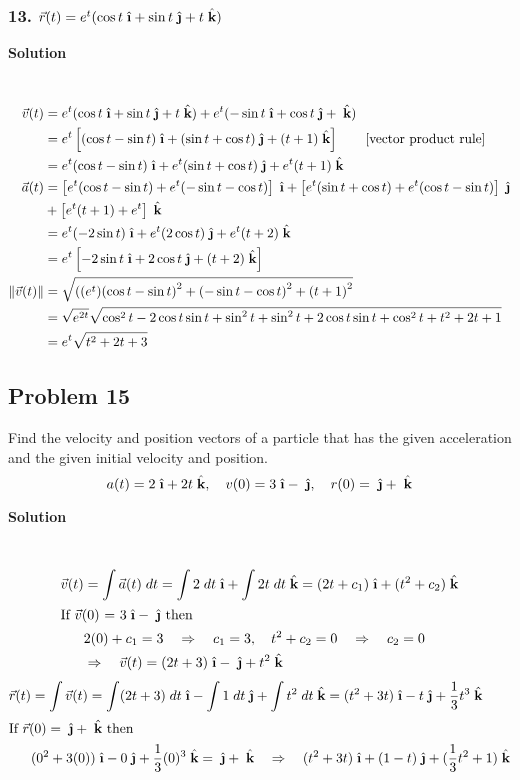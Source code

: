 \documentclass{article}
\newcommand{\ihat}{\;\hat{\textbf{\i}}}
\newcommand{\jhat}{\;\hat{\textbf{\j}}}
\newcommand{\khat}{\;\hat{\textbf{k}}}
\newcommand{\rvec}{\vec{r}(t)}
\newcommand\vc[2]{\vec{#1}(#2)}
\newcommand\mgv[1]{\|#1\|}
\newcommand\mgvvv[3]{\sqrt{\left(#1\right)^2 + \left(#2\right)^2 + \left(#3\right)^2}}
\newcommand\rr{\quad\Rightarrow\quad}
\begin{document}
\subsubsection*{13. $\rvec = e^t(\cos t\ihat + \sin t\jhat + t\khat)$}
\centerline{\textbf{Solution}} \\
\begin{align*}
    \vc v t &= e^t(\cos t\ihat + \sin t\jhat + t\khat) + e^t(-\sin t\ihat + \cos t\jhat + \khat)  \\
            &= e^t\left[(\cos t - \sin t)\ihat + (\sin t + \cos t)\jhat + (t + 1)\khat\right] \qquad [\text{vector product rule}] \\
            &= e^t(\cos t - \sin t)\ihat + e^t(\sin t + \cos t)\jhat + e^t(t + 1)\khat \\
    \vc a t &= \left[e^t(\cos t - \sin t) + e^t(-\sin t - \cos t)\right]\ihat + \left[e^t(\sin t + \cos t) + e^t(\cos t - \sin t)\right]\jhat \\
            &+ \left[e^t(t + 1) + e^t\right]\khat \\
            &= e^t(-2\sin t)\ihat + e^t(2\cos t)\jhat + e^t(t + 2)\khat \\
            &= e^t\left[-2\sin t\ihat + 2\cos t\jhat + (t + 2)\khat \right] \\
    \mgv{\vc v t} &= \mgvvv{(e^t) (\cos t - \sin t}{-\sin t - \cos t}{t + 1} \\
                  &= \sqrt{e^{2t}}\sqrt{\cos^2 t - 2\cos t \sin t + \sin^2 t + \sin^2 t + 2\cos t \sin t + \cos^2 t + t^2 + 2t + 1} \\ 
                  &= e^t\sqrt{t^2 + 2t + 3} \\
\end{align*}
\subsection*{Problem 15}

Find the velocity and position vectors of a particle that has the given acceleration and the given initial velocity and position.
\[
    a(t) = 2\ihat + 2t\khat, \quad v(0) = 3\ihat - \jhat, \quad r(0) = \jhat + \khat
\]
\centerline{\textbf{Solution}} \\
\begin{align*}
    \vc v t &= \int \vc a t \; dt  =  \int 2\;dt\ihat + \int 2t\;dt\khat  = (2t + c_1)\ihat + (t^2 + c_2)\khat \\
    \intertext{If $\vc v 0$ = $3\ihat - \jhat$ then}
            &2(0) + c_1 = 3 \rr c_1 = 3, \quad t^2 + c_2 = 0 \rr c_2 = 0 \\
            &\Rightarrow\quad \vc v t = (2t + 3)\ihat - \jhat + t^2\khat
\end{align*}
\begin{align*}
    \vc r t &= \int \vc v t = \int (2t + 3)\;dt\ihat - \int 1\;dt\jhat + \int t^2\;dt\khat = (t^2 + 3t)\ihat - t\jhat + \frac 1 3 t^3\khat \\
    \intertext{If $\vc r 0 = \jhat + \khat$ then}
            &(0^2 + 3(0))\ihat  - 0\jhat + \frac 1 3(0)^3\khat = \jhat + \khat \rr (t^2 + 3t)\ihat + (1 - t)\jhat + (\frac 1 3 t^2 + 1)\khat \\ 
\end{align*}
\end{document}
